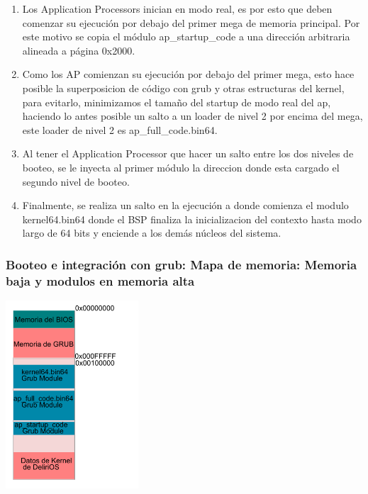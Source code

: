 \begin{itemize}
\begin{enumerate}
\begin{enumerate}
					\item Los Application Processors inician en modo real, es por esto que deben comenzar su ejecución por debajo del primer mega de memoria principal. Por este motivo se copia el módulo ap\_startup\_code a una dirección arbitraria alineada a página 0x2000.
					\vspace{0.1cm}
					\item Como los AP comienzan su ejecución por debajo del primer mega, esto hace posible la superposicion de código con grub y otras estructuras del kernel, para evitarlo, minimizamos el tamaño del startup de modo real del ap, haciendo lo antes posible un salto a un loader de nivel 2 por encima del mega, este loader de nivel 2 es ap\_full\_code.bin64.
					\vspace{0.1cm}
					\item Al tener el Application Processor que hacer un salto entre los dos niveles de booteo, se le inyecta al primer módulo la direccion donde esta cargado el segundo nivel de booteo.
					\vspace{0.1cm}
					\item Finalmente, se realiza un salto en la ejecución a donde comienza el modulo kernel64.bin64 donde el BSP finaliza la inicializacion del contexto hasta modo largo de 64 bits y enciende a los demás núcleos del sistema.
				\end{enumerate}
			\end{enumerate}
	\end{itemize}

	\subsubsection{Booteo e integración con grub: Mapa de memoria: Memoria baja y modulos en memoria alta}

	\begin{center}
		\includegraphics[height=7cm]{images/modules-map.pdf} 
	\end{center}
